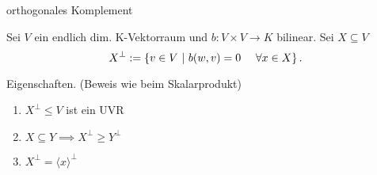 \documentclass[class=article, crop=false]{standalone}
\begin{document}
\begin{zettel}{orthogonales Komplement}
\begin{flashcard}{}
	\begin{definition}
		Sei $V$ ein endlich dim. K-Vektorraum und $b: V \times V \to  K $ bilinear. Sei $X \subseteq V$
		\[
			X^{\perp} := \set{v \in  V}{b (w,v ) = 0 \quad \forall x \in  X}
		.\]
	\end{definition}

\end{flashcard}

\begin{remark}
	Eigenschaften. (Beweis wie beim Skalarprodukt)
	\begin{enumerate}
		\item $X^{\perp} \leq V$ ist ein UVR
		\item $X \subseteq Y \implies X^{\perp} \geq Y^\perp$
		\item $X^{\perp}= \langle x\rangle^\perp$
	\end{enumerate}
\end{remark}

\end{zettel}
\end{document}
